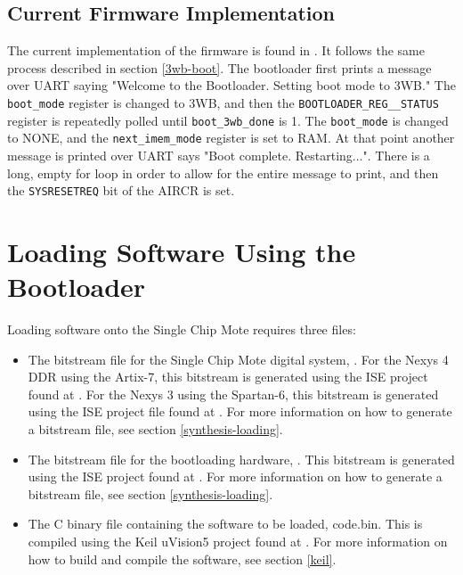\subsection{Current Firmware Implementation}
The current implementation of the firmware is found in . It follows the same process described in section \ref{3wb-boot}. The bootloader first prints a message over UART saying "Welcome to the Bootloader. Setting boot mode to 3WB." The \texttt{boot\_mode} register is changed to 3WB, and then the \texttt{BOOTLOADER\_REG\_\_STATUS} register is repeatedly polled until \texttt{boot\_3wb\_done} is 1. The \texttt{boot\_mode} is changed to NONE, and the \texttt{next\_imem\_mode} register is set to RAM. At that point another message is printed over UART says "Boot complete. Restarting...". There is a long, empty for loop in order to allow for the entire message to print, and then the \texttt{SYSRESETREQ} bit of the AIRCR is set.

\section{Loading Software Using the Bootloader} \label{loading-sw}
Loading software onto the Single Chip Mote requires three files:

\begin{itemize}
	\item The bitstream file for the Single Chip Mote digital system, . For the Nexys 4 DDR using the Artix-7, this bitstream is generated using the ISE project found at . For the Nexys 3 using the Spartan-6, this bitstream is generated using the ISE project file found at . For more information on how to generate a bitstream file, see section \ref{synthesis-loading}.
	\item The bitstream file for the bootloading hardware, . This bitstream is generated using the ISE project found at . For more information on how to generate a bitstream file, see section \ref{synthesis-loading}.
	\item The C binary file containing the software to be loaded, code.bin. This is compiled using the Keil uVision5 project found at . For more information on how to build and compile the software, see section \ref{keil}.
\end{itemize}

